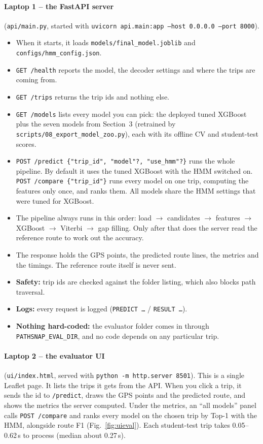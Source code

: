 \documentclass[11pt,a4paper]{article}
\newcommand{\code}[1]{\texttt{\small #1}}
\begin{document}
\paragraph{Laptop 1 -- the FastAPI server}
(\code{api/main.py}, started with \code{uvicorn api.main:app --host 0.0.0.0 --port 8000}).
\begin{itemize}
  \item When it starts, it loads \code{models/final\_model.joblib} and \code{configs/hmm\_config.json}.
  \item \code{GET /health} reports the model, the decoder settings and where the trips are coming from.
  \item \code{GET /trips} returns the trip ids and nothing else.
  \item \code{GET /models} lists every model you can pick: the deployed tuned XGBoost plus the seven models
        from Section~3 (retrained by \code{scripts/08\_export\_model\_zoo.py}), each with its offline CV and
        student-test scores.
  \item \code{POST /predict \{"trip\_id", "model"?, "use\_hmm"?\}} runs the whole pipeline. By default it uses
        the tuned XGBoost with the HMM switched on.
        \code{POST /compare \{"trip\_id"\}} runs every model on one trip, computing the features only once,
        and ranks them. All models share the HMM settings that were tuned for XGBoost.
  \item The pipeline always runs in this order: load $\rightarrow$ candidates $\rightarrow$ features
        $\rightarrow$ XGBoost $\rightarrow$ Viterbi $\rightarrow$ gap filling. Only after that does the
        server read the reference route to work out the accuracy.
  \item The response holds the GPS points, the predicted route lines, the metrics and the timings. The
        reference route itself is never sent.
  \item \textbf{Safety:} trip ids are checked against the folder listing, which also blocks path traversal.
  \item \textbf{Logs:} every request is logged (\code{PREDICT \ldots} / \code{RESULT \ldots}).
  \item \textbf{Nothing hard-coded:} the evaluator folder comes in through \code{PATHSNAP\_EVAL\_DIR}, and no
        code depends on any particular trip.
\end{itemize}

\paragraph{Laptop 2 -- the evaluator UI}
(\code{ui/index.html}, served with \code{python -m http.server 8501}).
This is a single Leaflet page. It lists the trips it gets from the API. When you click a trip, it sends the
id to \code{/predict}, draws the GPS points and the predicted route, and shows the metrics the server
computed. Under the metrics, an ``all models'' panel calls \code{POST /compare} and ranks every model on the
chosen trip by Top-1 with the HMM, alongside route F1 (Fig.~\ref{fig:uieval}). Each student-test trip takes
0.05--0.62\,s to process (median about 0.27\,s).
\end{document}
